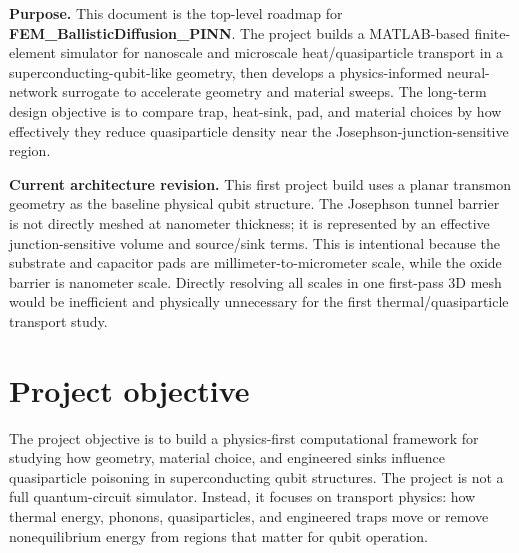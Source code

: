 \documentclass[11pt]{article}
\begin{document}

\begin{overviewbox}
\textbf{Purpose.} This document is the top-level roadmap for \textbf{FEM\_BallisticDiffusion\_PINN}. The project builds a MATLAB-based finite-element simulator for nanoscale and microscale heat/quasiparticle transport in a superconducting-qubit-like geometry, then develops a physics-informed neural-network surrogate to accelerate geometry and material sweeps. The long-term design objective is to compare trap, heat-sink, pad, and material choices by how effectively they reduce quasiparticle density near the Josephson-junction-sensitive region.
\end{overviewbox}

\ProjectTOC

\begin{notebox}
\textbf{Current architecture revision.} This first project build uses a planar transmon geometry as the baseline physical qubit structure. The Josephson tunnel barrier is not directly meshed at nanometer thickness; it is represented by an effective junction-sensitive volume and source/sink terms. This is intentional because the substrate and capacitor pads are millimeter-to-micrometer scale, while the oxide barrier is nanometer scale. Directly resolving all scales in one first-pass 3D mesh would be inefficient and physically unnecessary for the first thermal/quasiparticle transport study.
\end{notebox}

\section{Project objective}
The project objective is to build a physics-first computational framework for studying how geometry, material choice, and engineered sinks influence quasiparticle poisoning in superconducting qubit structures. The project is not a full quantum-circuit simulator. Instead, it focuses on transport physics: how thermal energy, phonons, quasiparticles, and engineered traps move or remove nonequilibrium energy from regions that matter for qubit operation.
\end{document}
